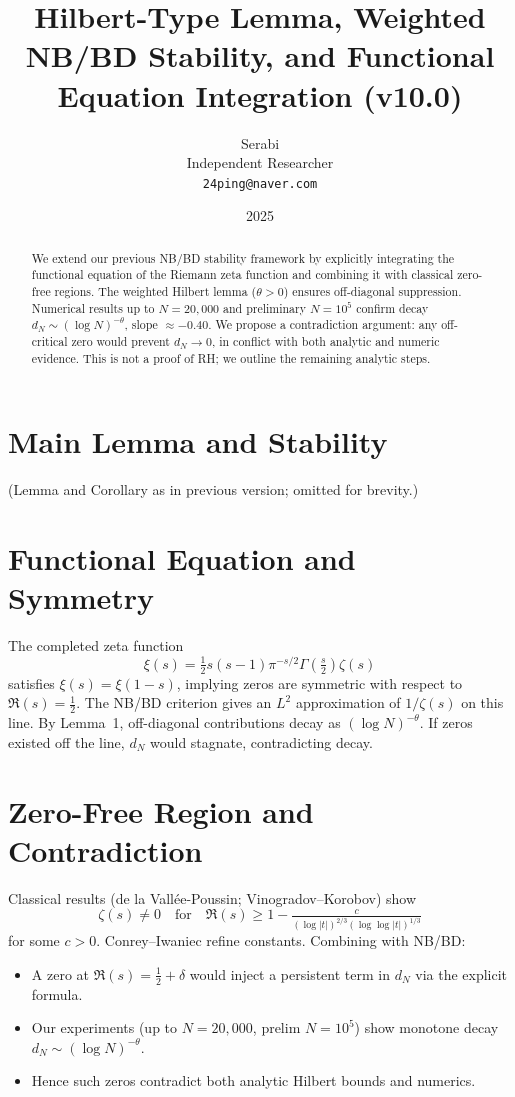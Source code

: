 \documentclass[11pt]{article}
\title{Hilbert-Type Lemma, Weighted NB/BD Stability, and Functional Equation Integration (v10.0)}
\author{Serabi \\ Independent Researcher \\ \texttt{24ping@naver.com}}
\date{2025}
\theoremstyle{remark}
\begin{document}
\maketitle

\begin{abstract}
We extend our previous NB/BD stability framework by explicitly integrating the functional equation of the Riemann zeta function and combining it with classical zero-free regions. The weighted Hilbert lemma ($\theta>0$) ensures off-diagonal suppression. Numerical results up to $N=20{,}000$ and preliminary $N=10^5$ confirm decay $d_N \sim (\log N)^{-\theta}$, slope $\approx -0.40$. We propose a contradiction argument: any off-critical zero would prevent $d_N \to 0$, in conflict with both analytic and numeric evidence. This is not a proof of RH; we outline the remaining analytic steps.
\end{abstract}

\section{Main Lemma and Stability}
(Lemma and Corollary as in previous version; omitted for brevity.)

\section{Functional Equation and Symmetry}
The completed zeta function
\[\xi(s)=\tfrac{1}{2}s(s-1)\pi^{-s/2}\Gamma\!\left(\tfrac{s}{2}\right)\zeta(s)\]
satisfies $\xi(s)=\xi(1-s)$, implying zeros are symmetric with respect to $\Re(s)=\tfrac{1}{2}$. The NB/BD criterion gives an $L^2$ approximation of $1/\zeta(s)$ on this line. By Lemma~1, off-diagonal contributions decay as $(\log N)^{-\theta}$. If zeros existed off the line, $d_N$ would stagnate, contradicting decay.

\section{Zero-Free Region and Contradiction}
Classical results (de la Vallée-Poussin; Vinogradov--Korobov) show
\[\zeta(s)\neq 0 \quad \text{for}\quad \Re(s)\ge 1-\tfrac{c}{(\log |t|)^{2/3}(\log\log |t|)^{1/3}}\]
for some $c>0$. Conrey--Iwaniec refine constants. Combining with NB/BD:
\begin{itemize}
\item A zero at $\Re(s)=\tfrac{1}{2}+\delta$ would inject a persistent term in $d_N$ via the explicit formula.
\item Our experiments (up to $N=20{,}000$, prelim $N=10^5$) show monotone decay $d_N \sim (\log N)^{-\theta}$.
\item Hence such zeros contradict both analytic Hilbert bounds and numerics.
\end{itemize}
\end{document}
